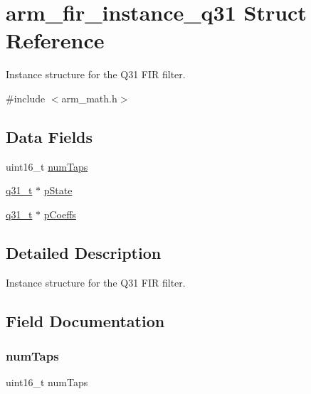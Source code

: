 \hypertarget{structarm__fir__instance__q31}{}\section{arm\+\_\+fir\+\_\+instance\+\_\+q31 Struct Reference}
\label{structarm__fir__instance__q31}


Instance structure for the Q31 F\+IR filter.  




{\ttfamily \#include $<$arm\+\_\+math.\+h$>$}

\subsection*{Data Fields}
\begin{DoxyCompactItemize}
\item 
uint16\+\_\+t \mbox{\hyperlink{structarm__fir__instance__q31_a751941891e47f522a7f5375fe8990aac}{num\+Taps}}
\item 
\mbox{\hyperlink{arm__math_8h_adc89a3547f5324b7b3b95adec3806bc0}{q31\+\_\+t}} $\ast$ \mbox{\hyperlink{structarm__fir__instance__q31_adee4ba3ee8869865af7d8fa08ca913d6}{p\+State}}
\item 
\mbox{\hyperlink{arm__math_8h_adc89a3547f5324b7b3b95adec3806bc0}{q31\+\_\+t}} $\ast$ \mbox{\hyperlink{structarm__fir__instance__q31_a68888e36167d81cb7836db10367a1682}{p\+Coeffs}}
\end{DoxyCompactItemize}


\subsection{Detailed Description}
Instance structure for the Q31 F\+IR filter. 

\subsection{Field Documentation}
\mbox{\label{structarm__fir__instance__q31_a751941891e47f522a7f5375fe8990aac}} 
\subsubsection{\texorpdfstring{numTaps}{numTaps}}
{\footnotesize\ttfamily uint16\+\_\+t num\+Taps}

